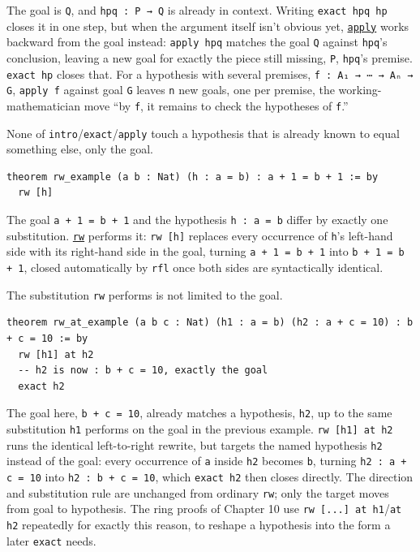 The goal is \texttt{Q}, and \texttt{hpq : P → Q} is already in context. Writing \texttt{exact hpq hp} closes it in one step, but when the argument itself isn't obvious yet, \href{https://lean-lang.org/doc/reference/latest/Tactic-Proofs/Tactic-Reference/}{\texttt{apply}} works backward from the goal instead: \texttt{apply hpq} matches the goal \texttt{Q} against \texttt{hpq}'s conclusion, leaving a new goal for exactly the piece still missing, \texttt{P}, \texttt{hpq}'s premise. \texttt{exact hp} closes that. For a hypothesis with several premises, \texttt{f : A₁ → ⋯ → Aₙ → G}, \texttt{apply f} against goal \texttt{G} leaves \texttt{n} new goals, one per premise, the working-mathematician move ``by \texttt{f}, it remains to check the hypotheses of \texttt{f}.''

None of \texttt{intro}/\texttt{exact}/\texttt{apply} touch a hypothesis that is already known to equal something else, only the goal.

\begin{lstlisting}
theorem rw_example (a b : Nat) (h : a = b) : a + 1 = b + 1 := by
  rw [h]
\end{lstlisting}

The goal \texttt{a + 1 = b + 1} and the hypothesis \texttt{h : a = b} differ by exactly one substitution. \href{https://lean-lang.org/doc/reference/latest/Tactic-Proofs/Tactic-Reference/}{\texttt{rw}} performs it: \texttt{rw [h]} replaces every occurrence of \texttt{h}'s left-hand side with its right-hand side in the goal, turning \texttt{a + 1 = b + 1} into \texttt{b + 1 = b + 1}, closed automatically by \texttt{rfl} once both sides are syntactically identical.

The substitution \texttt{rw} performs is not limited to the goal.

\begin{lstlisting}
theorem rw_at_example (a b c : Nat) (h1 : a = b) (h2 : a + c = 10) : b + c = 10 := by
  rw [h1] at h2
  -- h2 is now : b + c = 10, exactly the goal
  exact h2
\end{lstlisting}

The goal here, \texttt{b + c = 10}, already matches a hypothesis, \texttt{h2}, up to the same substitution \texttt{h1} performs on the goal in the previous example. \texttt{rw [h1] at h2} runs the identical left-to-right rewrite, but targets the named hypothesis \texttt{h2} instead of the goal: every occurrence of \texttt{a} inside \texttt{h2} becomes \texttt{b}, turning \texttt{h2 : a + c = 10} into \texttt{h2 : b + c = 10}, which \texttt{exact h2} then closes directly. The direction and substitution rule are unchanged from ordinary \texttt{rw}; only the target moves from goal to hypothesis. The ring proofs of Chapter 10 use \texttt{rw [...] at h1}/\texttt{at h2} repeatedly for exactly this reason, to reshape a hypothesis into the form a later \texttt{exact} needs.

